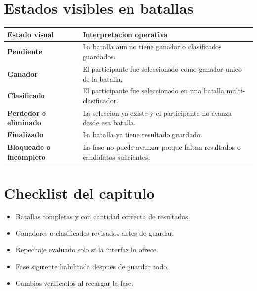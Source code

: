 \section{Estados visibles en batallas}

\begin{tabularx}{\linewidth}{>{\bfseries}p{3.8cm}X}
\toprule
Estado visual & Interpretacion operativa\\
\midrule
Pendiente & La batalla aun no tiene ganador o clasificados guardados.\\
Ganador & El participante fue seleccionado como ganador unico de la batalla.\\
Clasificado & El participante fue seleccionado en una batalla multi-clasificador.\\
Perdedor o eliminado & La seleccion ya existe y el participante no avanza desde esa batalla.\\
Finalizado & La batalla ya tiene resultado guardado.\\
Bloqueado o incompleto & La fase no puede avanzar porque faltan resultados o candidatos suficientes.\\
\bottomrule
\end{tabularx}

\section{Checklist del capitulo}

\begin{itemize}
    \item Batallas completas y con cantidad correcta de resultados.
    \item Ganadores o clasificados revisados antes de guardar.
    \item Repechaje evaluado solo si la interfaz lo ofrece.
    \item Fase siguiente habilitada despues de guardar todo.
    \item Cambios verificados al recargar la fase.
\end{itemize}
